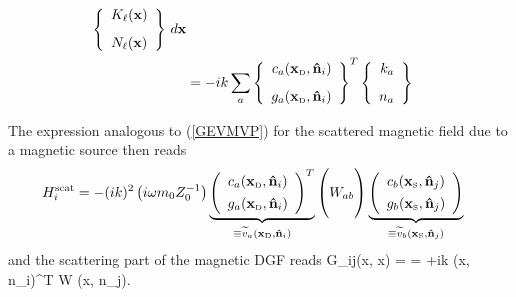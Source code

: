 \documentclass[letterpaper]{article}
\newcommand{\wt}{\widetilde}
\begin{document}
\begin{itemize}
\begin{align}
  \left\{\begin{array}{c}
   K_\ell(\mathbf{x}) 
   \\[8pt]
   N_\ell(\mathbf{x})
  \end{array}\right\}
  \, d\mathbf{x}
\\
&= -ik \sum_{a}
  \left\{\begin{array}{r}
  c_a(\mathbf{x}_{\hbox{\tiny{D}}}, \mathbf{\hat n}_i)
   \\[8pt]
  g_a(\mathbf{x}_{\hbox{\tiny{D}}}, \mathbf{\hat n}_i)
  \end{array}\right\}^T
  \left\{\begin{array}{r}
   k_a 
   \\[8pt]
   n_a
  \end{array}\right\}
\label{HScatKN}
\end{align}
\end{itemize}
The expression analogous to (\ref{GEVMVP}) for the scattered
magnetic field due to a magnetic source then reads
\begin{align*}
 H\sups{scat}_i
&=-(ik)^2 \left(i\omega m_0 Z_0^{-1}\right)
  \underbrace{
  \left(\begin{array}{c} 
      c_a(\vb x\subt{D}, \vbhat{n}_i)  \\[4pt]
      g_a(\vb x\subt{D}, \vbhat{n}_i)  
  \end{array}\right)^T
             }_{\equiv \wt{v}_a(\vb x\subt{D}, \vbhat{n}_i)}
  \left(
 \vphantom{
  \left\{\begin{array}{c} 
     g_a(\vb x\subt{D}, \vbhat{n}_i) \\[4pt]
    -c_a(\vb x\subt{D}, \vbhat{n}_i) 
  \end{array}\right\}^T
          }
         W_{ab}
  \right)
  \underbrace{
  \left(\begin{array}{c} 
     c_b(\vb x\subt{S}, \vbhat{n}_j)  \\[4pt]
     g_b(\vb x\subt{S}, \vbhat{n}_j)  
  \end{array}\right)
             }_{\equiv \wt{v}_b(\vb x\subt{S}, \vbhat{n}_j)}
\end{align*}
and the scattering part of the magnetic DGF reads
{
 \mc G_{ij}(\vb x, \vb x)
= 
= +ik \wt{\vb v}(\vb x, \vbhat n_{i})^T \vb W
      \wt{\vb v}(\vb x, \vbhat n_{j}).
}
\end{document}

